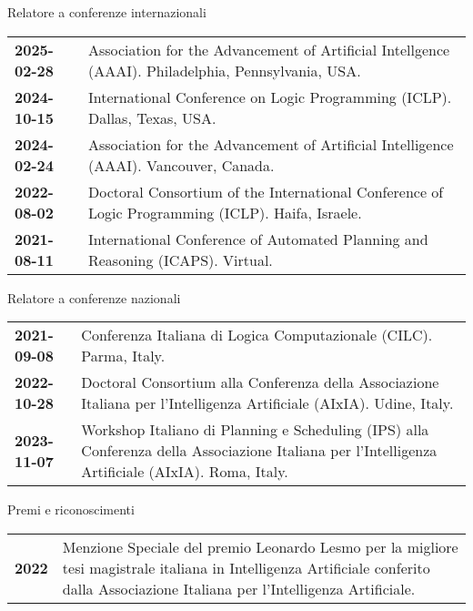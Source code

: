 \documentclass{resume} %
\begin{document}
\begin{rSection}{Relatore a conferenze internazionali}
	\begin{tabularx}{0.95\textwidth} {lp{14cm}}
 \textbf{2025-02-28} & Association for the Advancement of Artificial Intellgence (AAAI). Philadelphia, Pennsylvania, USA.\\
 \textbf{2024-10-15} & International Conference on Logic Programming (ICLP). Dallas, Texas, USA.\\
 \textbf{2024-02-24} & Association for the Advancement of Artificial Intelligence (AAAI). Vancouver, Canada.\\
 \textbf{2022-08-02} & Doctoral Consortium of the International Conference of Logic Programming (ICLP). Haifa, Israele.\\
 \textbf{2021-08-11} & International Conference of Automated Planning and Reasoning (ICAPS). Virtual.\\
 \end{tabularx}
 \end{rSection}
 

 \begin{rSection}{Relatore a conferenze nazionali}
	\begin{tabularx}{0.95\textwidth} {lp{14cm}}
 \textbf{2021-09-08} & Conferenza Italiana di Logica Computazionale (CILC).  Parma, Italy.\\
 \textbf{2022-10-28} & Doctoral Consortium alla Conferenza della Associazione Italiana per l'Intelligenza Artificiale (AIxIA). Udine, Italy.\\
 \textbf{2023-11-07} & Workshop Italiano di Planning e Scheduling (IPS) alla Conferenza della Associazione Italiana per l'Intelligenza Artificiale (AIxIA). Roma, Italy.
  \end{tabularx}
 \end{rSection}
 
 \begin{rSection}{Premi e riconoscimenti}
 \begin{tabularx}{0.95\textwidth} {lp{14cm}}

\textbf{2022}  & Menzione Speciale del premio Leonardo Lesmo per la migliore tesi magistrale italiana in Intelligenza Artificiale conferito dalla Associazione Italiana per l'Intelligenza Artificiale. 
  \end{tabularx}
\end{rSection}
\end{document}
